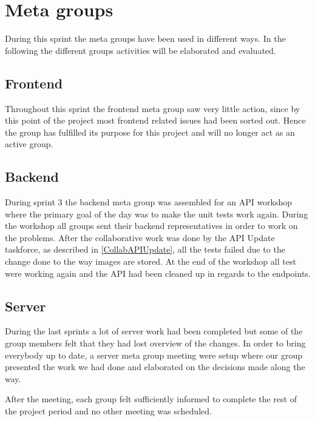 \section{Meta groups}
During this sprint the meta groups have been used in different ways.
In the following the different groups activities will be elaborated and evaluated.

\subsection{Frontend}
Throughout this sprint the frontend meta group saw very little action, since by this point of the project most frontend related issues had been sorted out.
Hence the group has fulfilled its purpose for this project and will no longer act as an active group.

\subsection{Backend}
During sprint 3 the backend meta group was assembled for an API workshop where the primary goal of the day was to make the unit tests work again.
During the workshop all groups sent their backend representatives in order to work on the problems.
After the collaborative work was done by the API Update taskforce, as described in \autoref{CollabAPIUpdate}, all the tests failed due to the change done to the way images are stored.
At the end of the workshop all test were working again and the API had been cleaned up in regards to the endpoints.

\subsection{Server}
During the last sprints a lot of server work had been completed but some of the group members felt that they had lost overview of the changes.
In order to bring everybody up to date, a server meta group meeting were setup where our group presented the work we had done and elaborated on the decisions made along the way.

After the meeting, each group felt sufficiently informed to complete the rest of the project period and no other meeting was scheduled.
